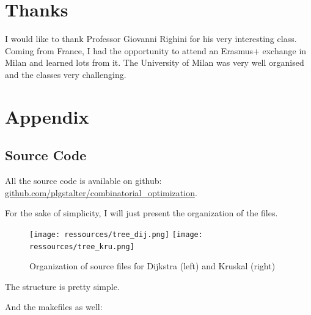 \documentclass{article}
\begin{document}
\section{Thanks}

I would like to thank Professor Giovanni Righini for his very interesting class. Coming from France, I had the opportunity to attend an Erasmus+ exchange in Milan and learned lots from it. The University of Milan was very well organised and the classes very challenging. 

\newpage

\section{Appendix}

\subsection{Source Code}

All the source code is available on github: \href{https://www.github.com/plgstalter/combinatorial_optimization}{github.com/plgstalter/combinatorial\_optimization}.

For the sake of simplicity, I will just present the organization of the files.

\begin{figure}[htp]
	\centering
	\texttt{[image: ressources/tree\_dij.png]}
	\hfill
	\texttt{[image: ressources/tree\_kru.png]}
	\caption{Organization of source files for Dijkstra (left) and Kruskal (right)}
\end{figure}

The structure is pretty simple.

\newpage

And the makefiles as well:
\end{document}

